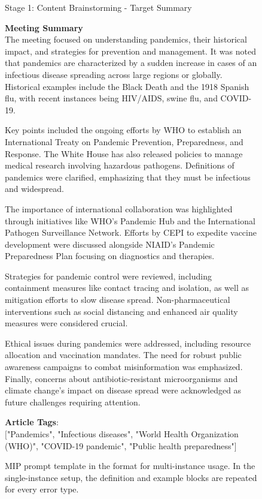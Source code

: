 \begin{figure*}[t]
    \begin{AIbox}{Stage 1: Content Brainstorming - Target Summary}
    \parbox[t]{\textwidth}{
        \textbf{Meeting Summary}\\
        The meeting focused on understanding pandemics, their historical impact, and strategies for prevention and management. It was noted that pandemics are characterized by a sudden increase in cases of an infectious disease spreading across large regions or globally. Historical examples include the Black Death and the 1918 Spanish flu, with recent instances being HIV/AIDS, swine flu, and COVID-19.
    
        Key points included the ongoing efforts by WHO to establish an International Treaty on Pandemic Prevention, Preparedness, and Response. The White House has also released policies to manage medical research involving hazardous pathogens. Definitions of pandemics were clarified, emphasizing that they must be infectious and widespread.
    
        The importance of international collaboration was highlighted through initiatives like WHO's Pandemic Hub and the International Pathogen Surveillance Network. Efforts by CEPI to expedite vaccine development were discussed alongside NIAID's Pandemic Preparedness Plan focusing on diagnostics and therapies.
    
        Strategies for pandemic control were reviewed, including containment measures like contact tracing and isolation, as well as mitigation efforts to slow disease spread. Non-pharmaceutical interventions such as social distancing and enhanced air quality measures were considered crucial.
    
        Ethical issues during pandemics were addressed, including resource allocation and vaccination mandates. The need for robust public awareness campaigns to combat misinformation was emphasized. Finally, concerns about antibiotic-resistant microorganisms and climate change's impact on disease spread were acknowledged as future challenges requiring attention.
    
        \textbf{Article Tags}: \\
        $\bigr[$"Pandemics", "Infectious diseases", "World Health Organization (WHO)", "COVID-19 pandemic", "Public health preparedness"$\bigr]$
    }
    \end{AIbox}
    \caption{MIP prompt template in the format for multi-instance usage. In the single-instance setup, the definition and example blocks are repeated for every error type.}
    \label{fig:stage1_scouting}
\end{figure*}



